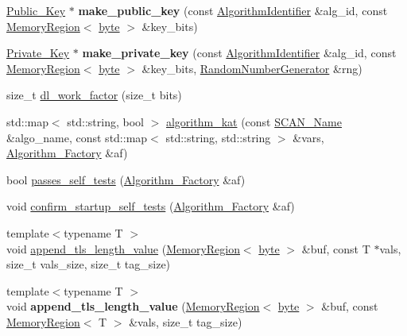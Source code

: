 \begin{DoxyCompactItemize}
\item 
\hypertarget{namespaceBotan_a57ccd5d2c71c90ed942eeea81ce772f1}{\hyperlink{classBotan_1_1Public__Key}{Public\-\_\-\-Key} $\ast$ {\bfseries make\-\_\-public\-\_\-key} (const \hyperlink{classBotan_1_1AlgorithmIdentifier}{Algorithm\-Identifier} \&alg\-\_\-id, const \hyperlink{classBotan_1_1MemoryRegion}{Memory\-Region}$<$ \hyperlink{namespaceBotan_a7d793989d801281df48c6b19616b8b84}{byte} $>$ \&key\-\_\-bits)}\label{namespaceBotan_a57ccd5d2c71c90ed942eeea81ce772f1}

\item 
\hypertarget{namespaceBotan_a229120a7c7c23ba260a114ad6c46cc88}{\hyperlink{classBotan_1_1Private__Key}{Private\-\_\-\-Key} $\ast$ {\bfseries make\-\_\-private\-\_\-key} (const \hyperlink{classBotan_1_1AlgorithmIdentifier}{Algorithm\-Identifier} \&alg\-\_\-id, const \hyperlink{classBotan_1_1MemoryRegion}{Memory\-Region}$<$ \hyperlink{namespaceBotan_a7d793989d801281df48c6b19616b8b84}{byte} $>$ \&key\-\_\-bits, \hyperlink{classBotan_1_1RandomNumberGenerator}{Random\-Number\-Generator} \&rng)}\label{namespaceBotan_a229120a7c7c23ba260a114ad6c46cc88}

\item 
size\-\_\-t \hyperlink{namespaceBotan_a3ad494d424e7cb89e7bf62d64858099d}{dl\-\_\-work\-\_\-factor} (size\-\_\-t bits)
\item 
std\-::map$<$ std\-::string, bool $>$ \hyperlink{namespaceBotan_a644f930063760eb5e426a98a093cd395}{algorithm\-\_\-kat} (const \hyperlink{classBotan_1_1SCAN__Name}{S\-C\-A\-N\-\_\-\-Name} \&algo\-\_\-name, const std\-::map$<$ std\-::string, std\-::string $>$ \&vars, \hyperlink{classBotan_1_1Algorithm__Factory}{Algorithm\-\_\-\-Factory} \&af)
\item 
bool \hyperlink{namespaceBotan_a8c81cb2485c5fcb5e634beefbae006b4}{passes\-\_\-self\-\_\-tests} (\hyperlink{classBotan_1_1Algorithm__Factory}{Algorithm\-\_\-\-Factory} \&af)
\item 
void \hyperlink{namespaceBotan_a9b4218c419db448edce4859639d8a67a}{confirm\-\_\-startup\-\_\-self\-\_\-tests} (\hyperlink{classBotan_1_1Algorithm__Factory}{Algorithm\-\_\-\-Factory} \&af)
\item 
{\footnotesize template$<$typename T $>$ }\\void \hyperlink{namespaceBotan_adbbbf12396fa9b5a602e7aef931be8ad}{append\-\_\-tls\-\_\-length\-\_\-value} (\hyperlink{classBotan_1_1MemoryRegion}{Memory\-Region}$<$ \hyperlink{namespaceBotan_a7d793989d801281df48c6b19616b8b84}{byte} $>$ \&buf, const T $\ast$vals, size\-\_\-t vals\-\_\-size, size\-\_\-t tag\-\_\-size)
\item 
\hypertarget{namespaceBotan_a161cc879d0052b902a2a80ebb94e2bd0}{{\footnotesize template$<$typename T $>$ }\\void {\bfseries append\-\_\-tls\-\_\-length\-\_\-value} (\hyperlink{classBotan_1_1MemoryRegion}{Memory\-Region}$<$ \hyperlink{namespaceBotan_a7d793989d801281df48c6b19616b8b84}{byte} $>$ \&buf, const \hyperlink{classBotan_1_1MemoryRegion}{Memory\-Region}$<$ T $>$ \&vals, size\-\_\-t tag\-\_\-size)}\label{namespaceBotan_a161cc879d0052b902a2a80ebb94e2bd0}


\end{DoxyCompactItemize}
